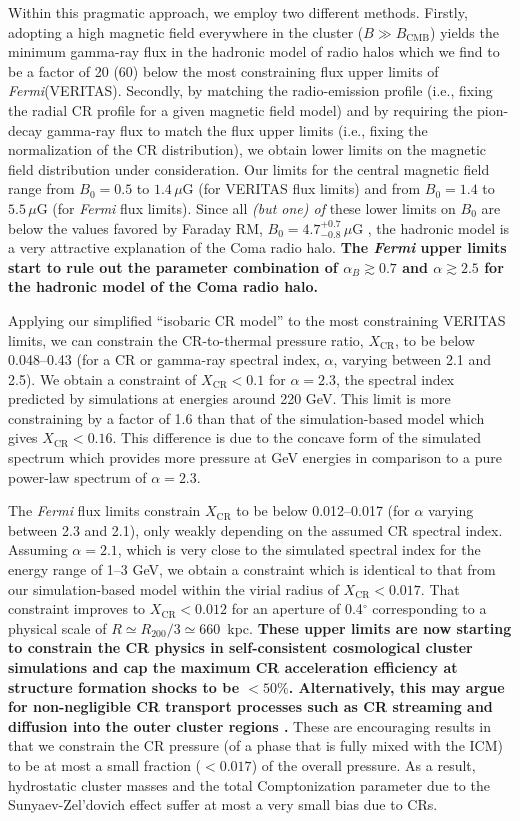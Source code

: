\documentclass[12pt,manuscript]{aastex}
\def\Fermi{{\em Fermi}\xspace}
\newcommand{\rmn}{\mathrm}
\newcommand{\CR}{\mathrm{CR}}
\begin{document}
Within this pragmatic approach, we employ two different methods. Firstly, adopting a high magnetic
field everywhere in the cluster ($B\gg B_\rmn{CMB}$) yields the minimum gamma-ray flux in the
hadronic model of radio halos which we find to be a factor of 20 (60) below the most constraining
flux upper limits of \Fermi (VERITAS). Secondly, by matching the radio-emission profile (i.e.,
fixing the radial CR profile for a given magnetic field model) and by requiring the pion-decay
gamma-ray flux to match the flux upper limits (i.e., fixing the normalization of the CR
distribution), we obtain lower limits on the magnetic field distribution under consideration. Our
limits for the central magnetic field range from $B_{0} = 0.5$ to $1.4\,\mu$G (for VERITAS flux
limits) and from $B_{0} = 1.4$ to $5.5\,\mu$G (for \Fermi flux limits). Since all {\em (but one) of}
these lower limits on $B_0$ are below the values favored by Faraday RM, $B_{0} =
4.7^{+0.7}_{-0.8}\,\mu$G \citep{article:Bonafede_etal:2010}, the hadronic model is a very attractive
explanation of the Coma radio halo.  {\bf The \Fermi upper limits start to rule out the parameter
  combination of $\alpha_{B}\gtrsim 0.7$ and $\alpha \gtrsim 2.5$ for the hadronic model of the Coma
  radio halo.}

Applying our simplified ``isobaric CR model'' to the most constraining VERITAS limits, we can
constrain the CR-to-thermal pressure ratio, $X_\CR$, to be below 0.048--0.43 (for a CR or
gamma-ray spectral index, $\alpha$, varying between 2.1 and 2.5). We obtain a constraint of
$X_\CR<0.1$ for $\alpha=2.3$, the spectral index predicted by simulations at energies around 220
GeV. This limit is
more constraining by a factor of 1.6 than that of the simulation-based model which gives
$X_\CR<0.16$. This difference is due to the concave form of the simulated spectrum which provides
more pressure at GeV energies in comparison to a pure power-law spectrum of $\alpha=2.3$.

The \Fermi flux limits constrain $X_\CR$ to be below 0.012--0.017 (for $\alpha$ varying between 2.3
and 2.1), only weakly depending on the assumed CR spectral index. Assuming $\alpha=2.1$, which is
very close to the simulated spectral index for the energy range of 1--3 GeV, we obtain a constraint
which is identical to that from our simulation-based model within the virial radius of
$X_\CR<0.017$. That constraint improves to $X_{\CR}<0.012$ for an aperture of 0.4$^\circ$
corresponding to a physical scale of $R \simeq R_{200}/3 \simeq 660$~kpc.  {\bf These upper limits
  are now starting to constrain the CR physics in self-consistent cosmological cluster simulations
  and cap the maximum CR acceleration efficiency at structure formation shocks to be
  $<50\%$. Alternatively, this may argue for non-negligible CR transport processes such as CR
  streaming and diffusion into the outer cluster regions \citep{article:Aleksic_etal:2012}.} These
are encouraging results in that we constrain the CR pressure (of a phase that is fully mixed with
the ICM) to be at most a small fraction ($<0.017$) of the overall pressure. As a result, hydrostatic
cluster masses and the total Comptonization parameter due to the Sunyaev-Zel'dovich effect suffer at
most a very small bias due to CRs.
\end{document}

